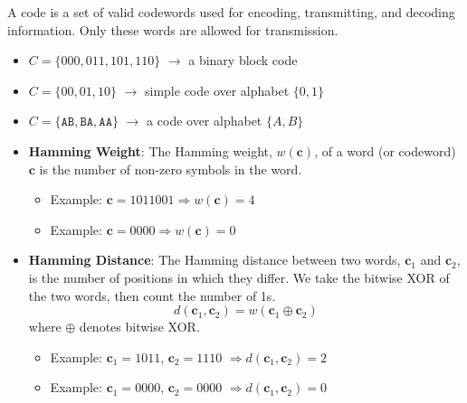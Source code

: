 \documentclass[11pt,a4paper]{book}
\newenvironment{definitionbox}[1][Definition]{
    \begin{tcolorbox}[
        enhanced,
        breakable,
        colback=primaryblue!10,
        colframe=primaryblue!150,
        title=#1,
        fonttitle=\bfseries,
        sharp corners,
        boxrule=0.8pt,
        left=8pt,
        right=8pt,
        top=6pt,
        bottom=6pt
    ]
}{
    \end{tcolorbox}
}
\begin{document}
\begin{definitionbox}[Code]
    A code is a set of valid codewords used for encoding, transmitting, and decoding information.
    Only these words are allowed for transmission.
    \begin{itemize}
        \item $C = \{000,011,101,110\}$ $\rightarrow$ a binary block code
        \item $C = \{00,01,10\}$ $\rightarrow$ simple code over alphabet $\{0,1\}$
        \item $C = \{\texttt{AB}, \texttt{BA}, \texttt{AA}\}$ $\rightarrow$ a code over alphabet $\{A,B\}$
    \end{itemize}
\end{definitionbox}

\begin{definitionbox}[Hamming Weight and Hamming Distance]
    \begin{itemize}
        \item \textbf{Hamming Weight}:
              The Hamming weight, $w(\mathbf{c})$, of a word (or codeword) $\mathbf{c}$
              is the number of non-zero symbols in the word.
              \begin{itemize}
                  \item Example: $\mathbf{c} = 1011001 \Rightarrow w(\mathbf{c}) = 4$
                  \item Example: $\mathbf{c} = 0000 \Rightarrow w(\mathbf{c}) = 0$
              \end{itemize}

        \item \textbf{Hamming Distance}:
              The Hamming distance between two words, $\mathbf{c}_1$ and $\mathbf{c}_2$,
              is the number of positions in which they differ.
              We take the bitwise XOR of the two words, then count the number of 1s.
              \[
                  d(\mathbf{c}_1, \mathbf{c}_2) = w(\mathbf{c}_1 \oplus \mathbf{c}_2)
              \]
              where $\oplus$ denotes bitwise XOR.
              \begin{itemize}
                  \item Example: $\mathbf{c}_1 = 1011$, $\mathbf{c}_2 = 1110$
                        $\Rightarrow d(\mathbf{c}_1, \mathbf{c}_2) = 2$
                  \item Example: $\mathbf{c}_1 = 0000$, $\mathbf{c}_2 = 0000$
                        $\Rightarrow d(\mathbf{c}_1, \mathbf{c}_2) = 0$
              \end{itemize}
    \end{itemize}
\end{definitionbox}
\end{document}
